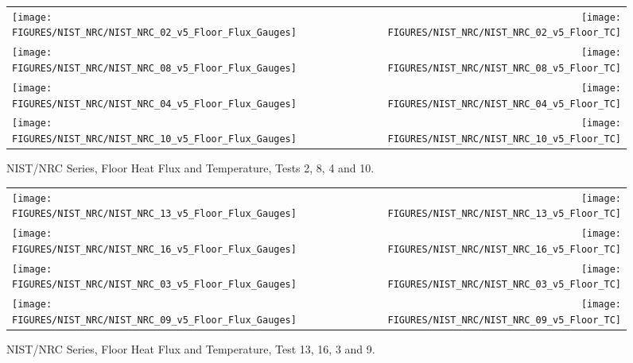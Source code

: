 \begin{figure}[p]
\begin{tabular*}{\textwidth}{l@{\extracolsep{\fill}}r}
\texttt{[image: FIGURES/NIST\_NRC/NIST\_NRC\_02\_v5\_Floor\_Flux\_Gauges]} &
\texttt{[image: FIGURES/NIST\_NRC/NIST\_NRC\_02\_v5\_Floor\_TC]} \\
\texttt{[image: FIGURES/NIST\_NRC/NIST\_NRC\_08\_v5\_Floor\_Flux\_Gauges]} &
\texttt{[image: FIGURES/NIST\_NRC/NIST\_NRC\_08\_v5\_Floor\_TC]} \\
\texttt{[image: FIGURES/NIST\_NRC/NIST\_NRC\_04\_v5\_Floor\_Flux\_Gauges]} &
\texttt{[image: FIGURES/NIST\_NRC/NIST\_NRC\_04\_v5\_Floor\_TC]} \\
\texttt{[image: FIGURES/NIST\_NRC/NIST\_NRC\_10\_v5\_Floor\_Flux\_Gauges]} &
\texttt{[image: FIGURES/NIST\_NRC/NIST\_NRC\_10\_v5\_Floor\_TC]}

\end{tabular*}
\caption{NIST/NRC Series, Floor Heat Flux and Temperature, Tests 2, 8, 4 and 10.}
\label{NIST_NRC_Floor_2}
\end{figure}

\begin{figure}[p]
\begin{tabular*}{\textwidth}{l@{\extracolsep{\fill}}r}
\texttt{[image: FIGURES/NIST\_NRC/NIST\_NRC\_13\_v5\_Floor\_Flux\_Gauges]} &
\texttt{[image: FIGURES/NIST\_NRC/NIST\_NRC\_13\_v5\_Floor\_TC]} \\
\texttt{[image: FIGURES/NIST\_NRC/NIST\_NRC\_16\_v5\_Floor\_Flux\_Gauges]} &
\texttt{[image: FIGURES/NIST\_NRC/NIST\_NRC\_16\_v5\_Floor\_TC]} \\
\texttt{[image: FIGURES/NIST\_NRC/NIST\_NRC\_03\_v5\_Floor\_Flux\_Gauges]} &
\texttt{[image: FIGURES/NIST\_NRC/NIST\_NRC\_03\_v5\_Floor\_TC]} \\
\texttt{[image: FIGURES/NIST\_NRC/NIST\_NRC\_09\_v5\_Floor\_Flux\_Gauges]} &
\texttt{[image: FIGURES/NIST\_NRC/NIST\_NRC\_09\_v5\_Floor\_TC]}

\end{tabular*}
\caption{NIST/NRC Series, Floor Heat Flux and Temperature, Test 13, 16, 3 and 9.}
\label{NIST_NRC_Floor_3}
\end{figure}

